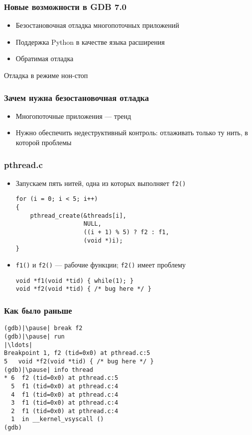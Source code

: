 \documentclass[onlymath]{beamer}
\newcommand\code\texttt
\begin{document}
\begin{frame}
  \frametitle{Новые возможности в GDB 7.0}
  \begin{itemize}
  \item Безостановочная отладка многопоточных приложений
  \item Поддержка Python в качестве языка расширения
  \item Обратимая отладка
  \end{itemize}
\end{frame}

\begin{subsection}{Отладка в режиме нон-стоп}
\begin{frame}
  \frametitle{Зачем нужна безостановочная отладка}
  \begin{itemize}
  \item Многопоточные приложения — тренд
  \item Нужно обеспечить недеструктивный контроль: отлаживать только
    ту нить, в которой проблемы
  \end{itemize}
\end{frame}

\begin{frame}[fragile]
  \frametitle{pthread.c}
  \begin{itemize}
  \item Запускаем пять нитей, одна из которых выполняет \code{f2()}
\begin{lstlisting}
for (i = 0; i < 5; i++)
{
    pthread_create(&threads[i],
                   NULL, 
                   ((i + 1) % 5) ? f2 : f1, 
                   (void *)i);
}
\end{lstlisting}
\item \code{f1()} и \code{f2()} — рабочие функции; \code{f2()} имеет проблему
\begin{lstlisting}
void *f1(void *tid) { while(1); }
void *f2(void *tid) { /* bug here */ }
\end{lstlisting}
  \end{itemize}
\end{frame}

\begin{frame}[fragile]
  \frametitle{Как было раньше}
\begin{lstlisting}[style=gdbsession]
(gdb)|\pause| break f2
(gdb)|\pause| run
|\ldots|
Breakpoint 1, f2 (tid=0x0) at pthread.c:5
5	void *f2(void *tid) { /* bug here */ }
(gdb)|\pause| info thread
* 6  f2 (tid=0x0) at pthread.c:5
  5  f1 (tid=0x0) at pthread.c:4
  4  f1 (tid=0x0) at pthread.c:4
  3  f1 (tid=0x0) at pthread.c:4
  2  f1 (tid=0x0) at pthread.c:4
  1  in __kernel_vsyscall ()
(gdb)
\end{lstlisting}
\end{frame}


\end{subsection}
\end{document}
